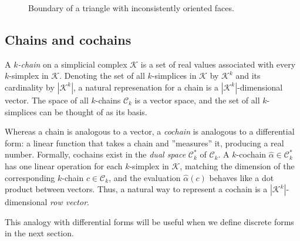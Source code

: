 \documentclass[utf8,english]{gradu3}
\begin{document}
\begin{figure}[h]
  \centering
  \caption{
    \label{fig:triangle_boundary}
    Boundary of a triangle with inconsistently oriented faces.
  }
\end{figure}


\subsection{Chains and cochains}\label{sec:chains}

A \textit{$k$-chain} on a simplicial complex $\mathcal{K}$
is a set of real values associated with every $k$-simplex in $\mathcal{K}$.
Denoting the set of all $k$-simplices in $\mathcal{K}$ by $\mathcal{K}^k$
and its cardinality by $|\mathcal{K}^k|$,
a natural represenation for a chain is a $|\mathcal{K}^k|$-dimensional vector.
The space of all $k$-chains $\mathcal{C}_k$ is a vector space,
and the set of all $k$-simplices can be thought of as its basis.

Whereas a chain is analogous to a vector,
a \textit{cochain} is analogous to a differential form:
a linear function that takes a chain and ''measures'' it,
producing a real number.
Formally, cochains exist in the \textit{dual space} $\mathcal{C}_k^*$ of $\mathcal{C}_k$.
A $k$-cochain $\widehat{\alpha} \in \mathcal{C}_k^*$
has one linear operation for each $k$-simplex in $\mathcal{K}$,
matching the dimension of the corresponding $k$-chain $c \in \mathcal{C}_k$,
and the evaluation $\widehat{\alpha}(c)$
behaves like a dot product between vectors.
Thus, a natural way to represent a cochain
is a $|\mathcal{K}^k|$-dimensional \textit{row vector}.

This analogy with differential forms will be useful
when we define discrete forms in the next section.
\end{document}
